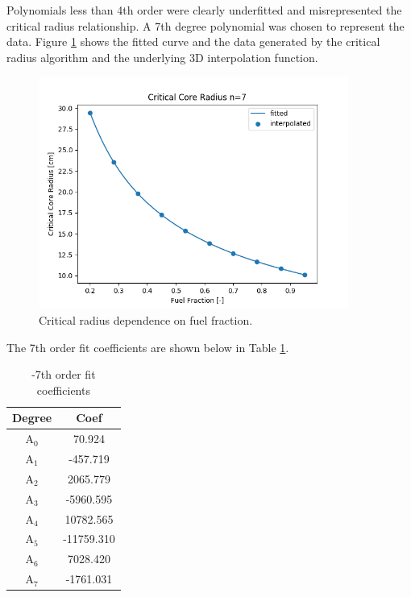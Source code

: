 Polynomials less than 4th order were clearly underfitted and misrepresented the
critical radius relationship. A 7th degree polynomial was chosen to represent the
data. Figure \ref{fig:core_r_co2_uo2} shows the fitted curve and the
data generated by the critical radius algorithm and the underlying 3D
interpolation function.

\begin{figure}[h]
    \centering
    \includegraphics[width=4in]{../images/uo2_co2_core_r.png}
\caption{Critical radius dependence on fuel fraction.}
\label{fig:core_r_co2_uo2}
\end{figure}

The 7th order fit coefficients are shown below in Table
\ref{tab:uo2_co2_fit_coeffs}.

\begin{table}[h]
  \centering
  \caption{\uox-\codiox 7th order fit coefficients}
  \begin{tabular}{cc}
    \toprule
     Degree & Coef\\ 
    \midrule                                  
    A$_0$  &  70.924\\
    A$_1$  &  -457.719\\
    A$_2$  &  2065.779\\
    A$_3$  &  -5960.595\\
    A$_4$  &  10782.565\\
    A$_5$  &  -11759.310\\
    A$_6$  &  7028.420\\
    A$_7$  &  -1761.031\\
  \end{tabular}
  \label{tab:uo2_co2_fit_coeffs}
\end{table}

